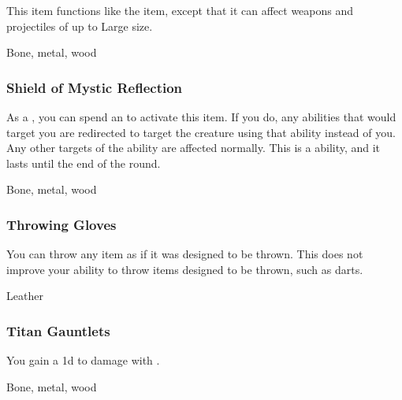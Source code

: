 This item functions like the  item, except that it can affect weapons and projectiles of up to Large size.



 Bone, metal, wood


\lowercase{\hypertarget{item:Shield of Mystic Reflection}{}}\label{item:Shield of Mystic Reflection}
\hypertarget{item:Shield of Mystic Reflection}{\subsubsection{Shield of Mystic Reflection\hfill{}}}

As a , you can spend an  to activate this item.
If you do, any   abilities that would target you are redirected to target the creature using that ability instead of you.
Any other targets of the ability are affected normally.
This is a  ability, and it lasts until the end of the round.



 


 Bone, metal, wood


\lowercase{\hypertarget{item:Throwing Gloves}{}}\label{item:Throwing Gloves}
\hypertarget{item:Throwing Gloves}{\subsubsection{Throwing Gloves\hfill{}}}

You can throw any item as if it was designed to be thrown.
This does not improve your ability to throw items designed to be thrown, such as darts.



 Leather


\lowercase{\hypertarget{item:Titan Gauntlets}{}}\label{item:Titan Gauntlets}
\hypertarget{item:Titan Gauntlets}{\subsubsection{Titan Gauntlets\hfill{}}}

You gain a \plus1d  to damage with .



 Bone, metal, wood


